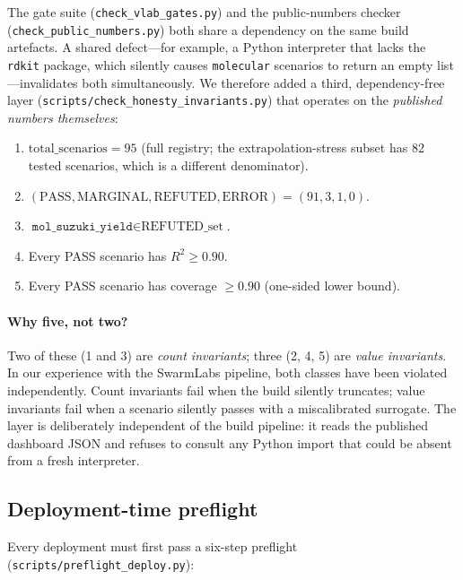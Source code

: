 \documentclass[review,3p]{elsarticle}
\begin{document}
The gate suite (\texttt{check\_vlab\_gates.py}) and the public-numbers checker (\texttt{check\_public\_numbers.py}) both share a dependency on the same build artefacts. A shared defect---for example, a Python interpreter that lacks the \texttt{rdkit} package, which silently causes \texttt{molecular} scenarios to return an empty list---invalidates both simultaneously. We therefore added a third, dependency-free layer (\texttt{scripts/check\_honesty\_invariants.py}) that operates on the \emph{published numbers themselves}:

\begin{enumerate}
    \item $\text{total\_scenarios} = 95$ (full registry; the extrapolation-stress subset has 82 tested scenarios, which is a different denominator).
    \item $(\text{PASS}, \text{MARGINAL}, \text{REFUTED}, \text{ERROR}) = (91, 3, 1, 0)$.
    \item $\texttt{mol\_suzuki\_yield} \in \text{REFUTED\_set}$.
    \item Every PASS scenario has $R^2 \ge 0.90$.
    \item Every PASS scenario has coverage $\ge 0.90$ (one-sided lower bound).
\end{enumerate}

\paragraph{Why five, not two?}
Two of these (1 and 3) are \emph{count invariants}; three (2, 4, 5) are \emph{value invariants}. In our experience with the SwarmLabs pipeline, both classes have been violated independently. Count invariants fail when the build silently truncates; value invariants fail when a scenario silently passes with a miscalibrated surrogate. The layer is deliberately independent of the build pipeline: it reads the published dashboard JSON and refuses to consult any Python import that could be absent from a fresh interpreter.

\subsection{Deployment-time preflight}
\label{sec:preflight}

Every deployment must first pass a six-step preflight (\texttt{scripts/preflight\_deploy.py}):
\end{document}
